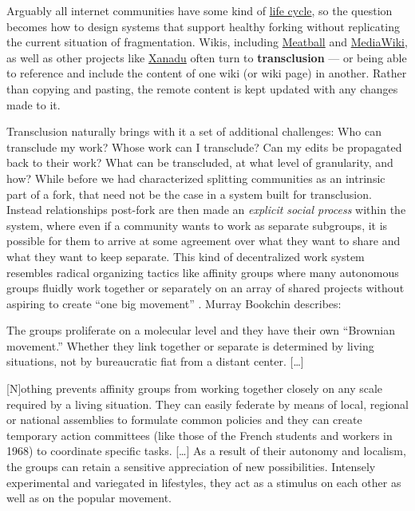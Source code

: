Arguably all internet communities have some kind of
\href{http://meatballwiki.org/wiki/WikiLifeCycle}{life cycle}, so the
question becomes how to design systems that support healthy forking
without replicating the current situation of fragmentation. Wikis,
including \href{http://www.meatballwiki.org/wiki/TransClusion}{Meatball}
and
\href{https://www.mediawiki.org/wiki/Extension:Interwiki}{MediaWiki}, as
well as other projects like
\href{https://en.wikipedia.org/wiki/Project_Xanadu}{Xanadu} often turn
to \textbf{transclusion} --- or being able to reference and include the
content of one wiki (or wiki page) in another. Rather than copying and
pasting, the remote content is kept updated with any changes made to it.

Transclusion naturally brings with it a set of additional challenges:
Who can transclude my work? Whose work can I transclude? Can my edits be
propagated back to their work? What can be transcluded, at what level of
granularity, and how? While before we had characterized splitting
communities as an intrinsic part of a fork, that need not be the case in
a system built for transclusion. Instead relationships post-fork are
then made an \emph{explicit social process} within the system, where
even if a community wants to work as separate subgroups, it is possible
for them to arrive at some agreement over what they want to share and
what they want to keep separate. This kind of decentralized work system
resembles radical organizing tactics like affinity groups where many
autonomous groups fluidly work together or separately on an array of
shared projects without aspiring to create ``one big movement'' \citep{kleinWereDCSeattle2001} . Murray Bookchin describes:

\begin{leftbar}
The groups proliferate on a molecular level and they have their own
``Brownian movement.'' Whether they link together or separate is
determined by living situations, not by bureaucratic fiat from a distant
center. {[}\ldots{]}

{[}N{]}othing prevents affinity groups from working together closely on
any scale required by a living situation. They can easily federate by
means of local, regional or national assemblies to formulate common
policies and they can create temporary action committees (like those of
the French students and workers in 1968) to coordinate specific tasks.
{[}\ldots{]} As a result of their autonomy and localism, the groups can
retain a sensitive appreciation of new possibilities. Intensely
experimental and variegated in lifestyles, they act as a stimulus on
each other as well as on the popular movement. \citep{bookchinNoteAffinityGroups1969} 
\end{leftbar}

